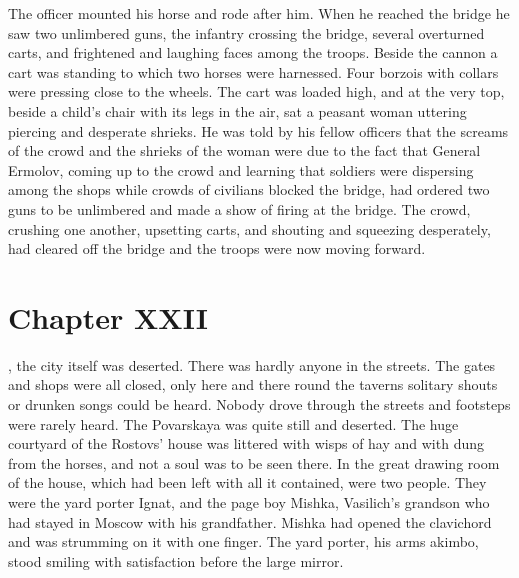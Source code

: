 The officer mounted his horse and rode after him. When he reached
the bridge he saw two unlimbered guns, the infantry crossing the
bridge, several overturned carts, and frightened and laughing
faces among the troops. Beside the cannon a cart was standing to
which two horses were harnessed. Four borzois with collars were
pressing close to the wheels.  The cart was loaded high, and at
the very top, beside a child's chair with its legs in the air,
sat a peasant woman uttering piercing and desperate shrieks. He
was told by his fellow officers that the screams of the crowd and
the shrieks of the woman were due to the fact that General
Ermolov, coming up to the crowd and learning that soldiers were
dispersing among the shops while crowds of civilians blocked the
bridge, had ordered two guns to be unlimbered and made a show of
firing at the bridge. The crowd, crushing one another, upsetting
carts, and shouting and squeezing desperately, had cleared off
the bridge and the troops were now moving forward.


\chapter*{Chapter XXII} \ifaudio {}
\fi

, the city itself was deserted. There was hardly anyone
in the streets. The gates and shops were all closed, only here
and there round the taverns solitary shouts or drunken songs
could be heard. Nobody drove through the streets and footsteps
were rarely heard. The Povarskaya was quite still and
deserted. The huge courtyard of the Rostovs' house was littered
with wisps of hay and with dung from the horses, and not a soul
was to be seen there. In the great drawing room of the house,
which had been left with all it contained, were two people. They
were the yard porter Ignat, and the page boy Mishka, Vasilich's
grandson who had stayed in Moscow with his grandfather.  Mishka
had opened the clavichord and was strumming on it with one
finger. The yard porter, his arms akimbo, stood smiling with
satisfaction before the large mirror.

